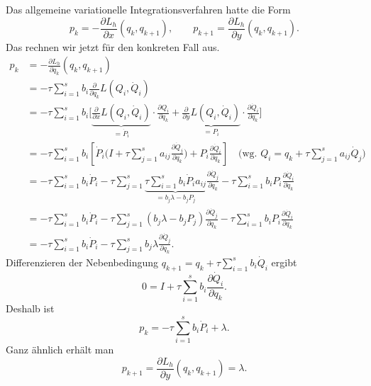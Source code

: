 Das allgemeine variationelle Integrationsverfahren hatte die Form
\begin{equation*}
	p_k = -\frac{\partial L_h}{\partial x}(q_k,q_{k+1}),
	\qquad
	p_{k+1} = \frac{\partial L_h}{\partial y}(q_k,q_{k+1}).
\end{equation*}
Das rechnen wir jetzt für den konkreten Fall aus.
\begin{align*}
	p_k &= -\frac{\partial L_h}{\partial q_k}(q_k,q_{k+1})\\
	&= -\tau\sum_{i=1}^s b_i\frac{\partial}{\partial q_k} L(Q_i,\dot{Q}_i)\\
	&= -\tau\sum_{i=1}^s b_i\Bigg[ \underbrace{\frac{\partial}{\partial x} L(Q_i,\dot{Q}_i)}_{=\dot{P}_i} \cdot \frac{\partial Q_i}{\partial q_k}
	+  \underbrace{\frac{\partial}{\partial y} L(Q_i,\dot{Q}_i)}_{=P_i} \cdot \frac{\partial\dot Q_i}{\partial q_k}     \Bigg] \\
	&= -\tau \sum_{i=1}^s b_i \left[\dot{P}_i\bigg( I +\tau\sum_{j=1}^s a_{ij}\frac{\partial\dot{Q}_j}{\partial q_k} \bigg) + P_i\frac{\partial\dot{Q}_i}{\partial q_k}\right]
	\quad \text{(wg. } Q_i = q_k+\tau\sum_{j=1}^s a_{ij}\dot{Q}_j\text{)}\\
	&= -\tau \sum_{i=1}^s b_i\dot{P}_i -\tau\sum_{j=1}^s\underbrace{\tau\sum_{i=1}^s b_i\dot{P}_i a_{ij}}_{=b_j\lambda -b_jP_j}\frac{\partial\dot{Q}_j}{\partial q_k}
	- \tau\sum_{i=1}^s b_i P_i\frac{\partial\dot{Q}_i}{\partial q_k}\\
	&= -\tau \sum_{i=1}^s b_i\dot{P}_i -\tau\sum_{j=1}^s(b_j\lambda -b_j P_j) \frac{\partial\dot{Q}_j}{\partial q_k}
	- \tau\sum_{i=1}^s b_i P_i\frac{\partial\dot{Q}_i}{\partial q_k}\\
	&= -\tau \sum_{i=1}^s b_i\dot{P}_i - \tau\sum_{j=1}^s b_j\lambda  \frac{\partial\dot{Q}_j}{\partial q_k}.
\end{align*}
Differenzieren der Nebenbedingung $q_{k+1} = q_k + \tau\sum_{i=1}^s b_i\dot{Q}_i$ ergibt
\begin{equation*}
	0 = I + \tau\sum_{i=1}^s b_i\frac{\partial \dot{Q}_i}{\partial q_k}.
\end{equation*}
Deshalb ist
\begin{equation}
	\label{eq:allgemeines_vi_hoher_ordnung_konkret_1}
	p_k = -\tau\sum_{i=1}^s b_i\dot{P}_i + \lambda.
\end{equation}
Ganz ähnlich erhält man
\begin{equation}
	\label{eq:allgemeines_vi_hoher_ordnung_konkret_2}
	p_{k+1} = \frac{\partial L_h}{\partial y}(q_k,q_{k+1}) = \lambda.
\end{equation}


